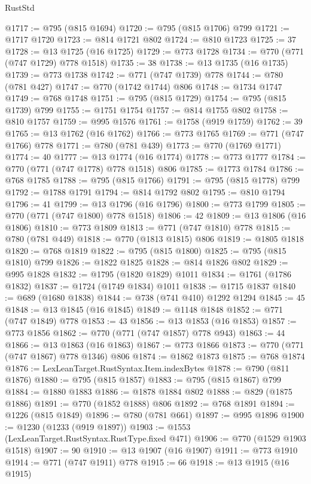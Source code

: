 \begin{lexlean}{RustStd}
\begin{coremodule}
{\begin{coremodule}
{{{{{{{{{{{{{{{@1717 := @795 (@815 @1694)
@1720 := @795 (@815 @1706) @799
@1721 := @1717 @1720
@1723 := @814 @1721 @802
@1724 := @810 @1723
@1725 := 37
@1728 := @13 @1725 (@16 @1725)
@1729 := @773 @1728
@1734 := @770 (@771 (@747 @1729) @778 @1518)
@1735 := 38
@1738 := @13 @1735 (@16 @1735)
@1739 := @773 @1738
@1742 := @771 (@747 @1739) @778
@1744 := @780 (@781 @427)
@1747 := @770 (@1742 @1744) @806
@1748 := @1734 @1747
@1749 := @768 @1748
@1751 := @795 (@815 @1729)
@1754 := @795 (@815 @1739) @799
@1755 := @1751 @1754
@1757 := @814 @1755 @802
@1758 := @810 @1757
@1759 := @995 @1576
@1761 := @1758 (@919 @1759)
@1762 := 39
@1765 := @13 @1762 (@16 @1762)
@1766 := @773 @1765
@1769 := @771 (@747 @1766) @778
@1771 := @780 (@781 @439)
@1773 := @770 (@1769 @1771)
@1774 := 40
@1777 := @13 @1774 (@16 @1774)
@1778 := @773 @1777
@1784 := @770 (@771 (@747 @1778) @778 @1518) @806
@1785 := @1773 @1784
@1786 := @768 @1785
@1788 := @795 (@815 @1766)
@1791 := @795 (@815 @1778) @799
@1792 := @1788 @1791
@1794 := @814 @1792 @802
@1795 := @810 @1794
@1796 := 41
@1799 := @13 @1796 (@16 @1796)
@1800 := @773 @1799
@1805 := @770 (@771 (@747 @1800) @778 @1518)
@1806 := 42
@1809 := @13 @1806 (@16 @1806)
@1810 := @773 @1809
@1813 := @771 (@747 @1810) @778
@1815 := @780 (@781 @449)
@1818 := @770 (@1813 @1815) @806
@1819 := @1805 @1818
@1820 := @768 @1819
@1822 := @795 (@815 @1800)
@1825 := @795 (@815 @1810) @799
@1826 := @1822 @1825
@1828 := @814 @1826 @802
@1829 := @995 @1828
@1832 := @1795 (@1820 @1829) @1011
@1834 := @1761 (@1786 @1832)
@1837 := @1724 (@1749 @1834) @1011
@1838 := @1715 @1837
@1840 := @689 (@1680 @1838)
@1844 := @738 (@741 @410) @1292 @1294
@1845 := 45
@1848 := @13 @1845 (@16 @1845)
@1849 := @1148 @1848
@1852 := @771 (@747 @1849) @778
@1853 := 43
@1856 := @13 @1853 (@16 @1853)
@1857 := @773 @1856
@1862 := @770 (@771 (@747 @1857) @778 @943)
@1863 := 44
@1866 := @13 @1863 (@16 @1863)
@1867 := @773 @1866
@1873 := @770 (@771 (@747 @1867) @778 @1346) @806
@1874 := @1862 @1873
@1875 := @768 @1874
@1876 := LexLeanTarget.RustSyntax.Item.indexBytes
@1878 := @790 (@811 @1876)
@1880 := @795 (@815 @1857)
@1883 := @795 (@815 @1867) @799
@1884 := @1880 @1883
@1886 := @1878 @1884 @802
@1888 := @829 (@1875 @1886)
@1891 := @770 (@1852 @1888) @806
@1892 := @768 @1891
@1894 := @1226 (@815 @1849)
@1896 := @780 (@781 @661)
@1897 := @995 @1896
@1900 := @1230 (@1233 (@919 @1897))
@1903 := @1553 (LexLeanTarget.RustSyntax.RustType.fixed @471)
@1906 := @770 (@1529 @1903 @1518)
@1907 := 90
@1910 := @13 @1907 (@16 @1907)
@1911 := @773 @1910
@1914 := @771 (@747 @1911) @778
@1915 := 66
@1918 := @13 @1915 (@16 @1915)
}}}}}}}}}}}}}}}
\end{coremodule}}
\end{coremodule}
\end{lexlean}
